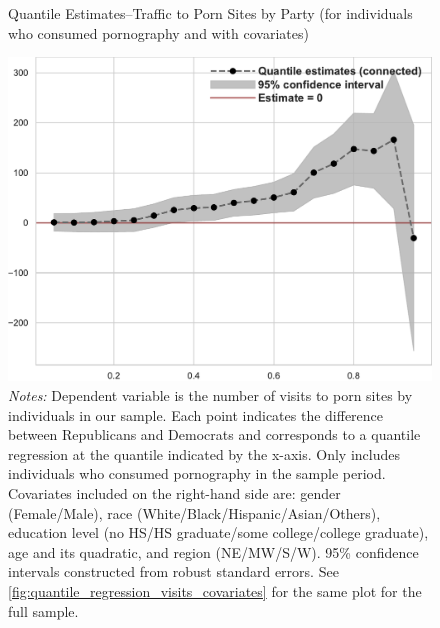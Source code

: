 \documentclass[12pt, letterpaper]{article}
\begin{document}
\begin{figure}
	\centering
	\caption{Quantile Estimates--Traffic to Porn Sites by Party (for individuals who consumed pornography and with covariates)}
	\includegraphics[width=.55\linewidth]{../figs/quantile_reg_nonzero_covariates_visits_adult.pdf}
	\caption*{\footnotesize \emph{Notes:} 
		Dependent variable is the number of visits to porn sites by individuals in our sample.
		Each point indicates the difference between Republicans and Democrats and corresponds to a quantile regression at the quantile indicated by the x-axis.
		Only includes individuals who consumed pornography in the sample period.
		Covariates included on the right-hand side are: gender (Female/Male), race (White/Black/Hispanic/Asian/Others), education level (no HS/HS graduate/some college/college graduate), age and its quadratic, and region (NE/MW/S/W).
		95\% confidence intervals constructed from robust standard errors.
		See \cref{fig:quantile_regression_visits_covariates} for the same plot for the full sample.
	}
	\label{fig:quantile_regression_visits_nonzeroes_covariates}
\end{figure}
\end{document}
